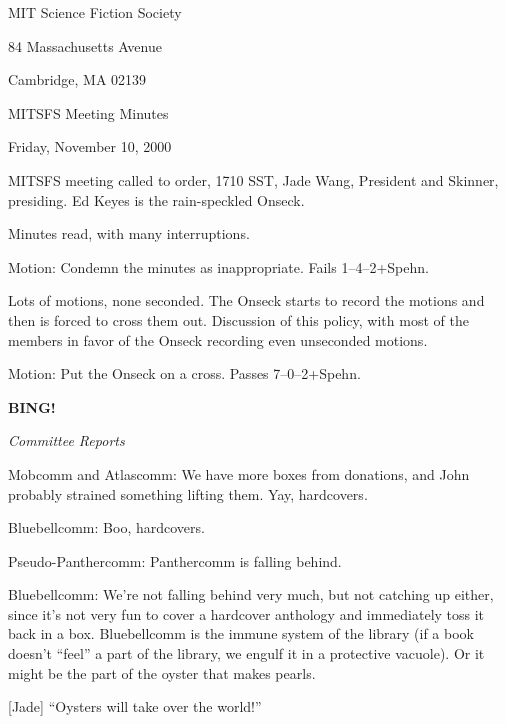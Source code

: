 \documentclass[12pt]{article}
\newcommand{\bing}{{\bf BING!} }
\newcommand{\goto}[1]{\bing \vskip 12pt \centerline{{\em{#1}}}}
\begin{document}
\begin{center}

MIT Science Fiction Society 

84 Massachusetts Avenue

Cambridge, MA 02139

\vspace{12pt}

MITSFS Meeting Minutes 

Friday, November 10, 2000

\end{center}
 
\vspace{18pt}

\setlength{\parskip}{6pt}

\noindent
MITSFS meeting called to order, 1710 SST, Jade Wang, President and
Skinner, presiding.  Ed Keyes is the rain-speckled Onseck.

Minutes read, with many interruptions.

Motion: Condemn the minutes as inappropriate.  Fails 1--4--2+Spehn.

Lots of motions, none seconded.  The Onseck starts to record the
motions and then is forced to cross them out.  Discussion of this
policy, with most of the members in favor of the Onseck recording
even unseconded motions.


Motion: Put the Onseck on a cross.  Passes 7--0--2+Spehn.

\goto{Committee Reports}

Mobcomm and Atlascomm: We have more boxes from donations, and John
probably strained something lifting them.  Yay, hardcovers.

Bluebellcomm: Boo, hardcovers.

Pseudo-Panthercomm: Panthercomm is falling behind.

Bluebellcomm: We're not falling behind very much, but not catching up
either, since it's not very fun to cover a hardcover anthology and
immediately toss it back in a box.  Bluebellcomm is the immune system
of the library (if a book doesn't ``feel'' a part of the library, we
engulf it in a protective vacuole).  Or it might be the part of the
oyster that makes pearls.

[Jade] ``Oysters will take over the world!''
\end{document}
